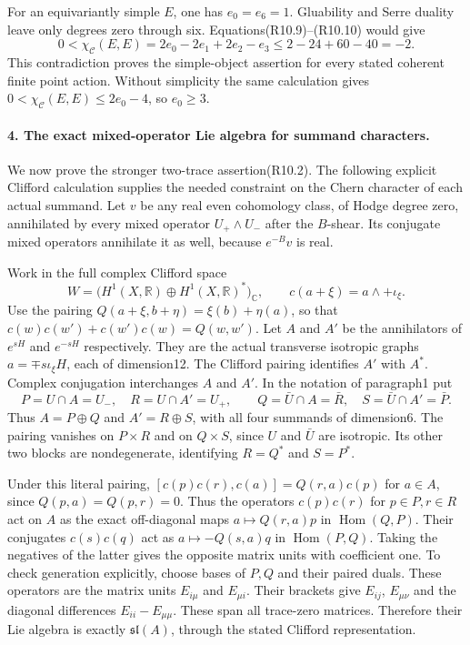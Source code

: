 For an equivariantly simple $E$, one has $e_0=e_6=1$.
Gluability and Serre duality leave only degrees zero through six.
Equations(R10.9)--(R10.10) would give
\[
 0<\chi_{\mathcal C}(E,E)
     =2e_0-2e_1+2e_2-e_3
                 \le2-24+60-40=-2.                         \tag{R10.11}
\]
This contradiction proves the simple-object assertion for every
stated coherent finite point action.
Without simplicity the same calculation gives
$0<\chi_{\mathcal C}(E,E)\le2e_0-4$, so $e_0\ge3$.

\paragraph{4. The exact mixed-operator Lie algebra for summand characters.}
We now prove the stronger two-trace assertion(R10.2).
The following explicit Clifford calculation supplies the needed
constraint on the Chern character of each actual summand.
Let $v$ be any real even cohomology class, of Hodge degree zero,
annihilated by every mixed operator $U_+\wedge U_-$ after the
$B$-shear. Its conjugate mixed operators annihilate it as well,
because $e^{-B}v$ is real.

Work in the full complex Clifford space
\[
 W=\bigl(H^1(X,\mathbb R)\oplus H^1(X,\mathbb R)^*\bigr)_{\mathbb C},
 \qquad c(a+\xi)=a\wedge+\iota_\xi.
\]
Use the pairing $Q(a+\xi,b+\eta)=\xi(b)+\eta(a)$, so that
$c(w)c(w')+c(w')c(w)=Q(w,w')$.
Let $A$ and $A'$ be the annihilators of $e^{sH}$ and
$e^{-sH}$ respectively. They are the actual transverse
isotropic graphs $a=\mp s\iota_\xi H$, each of dimension12.
The Clifford pairing identifies $A'$ with $A^*$.
Complex conjugation interchanges $A$ and $A'$. In the notation
of paragraph1 put
\[
 P=U\cap A=U_-,\quad R=U\cap A'=U_+,
 \qquad Q=\bar U\cap A=\bar R,\quad S=\bar U\cap A'=\bar P.
                                                               \tag{R10.12}
\]
Thus $A=P\oplus Q$ and $A'=R\oplus S$, with all four
summands of dimension6. The pairing vanishes on $P\times R$
and on $Q\times S$, since $U$ and $\bar U$ are isotropic.
Its other two blocks are nondegenerate, identifying
$R=Q^*$ and $S=P^*$.

Under this literal pairing,
$[c(p)c(r),c(a)]=Q(r,a)c(p)$ for $a\in A$, since
$Q(p,a)=Q(p,r)=0$. Thus the operators $c(p)c(r)$ for
$p\in P,r\in R$ act on $A$ as the exact off-diagonal
maps $a\mapsto Q(r,a)p$ in $\operatorname{Hom}(Q,P)$.
Their conjugates $c(s)c(q)$ act as
$a\mapsto-Q(s,a)q$ in $\operatorname{Hom}(P,Q)$.
Taking the negatives of the latter gives the opposite matrix
units with coefficient one. To check generation explicitly,
choose bases of $P,Q$ and their paired duals. These operators
are the matrix units $E_{i\mu}$ and $E_{\mu i}$.
Their brackets give $E_{ij}$, $E_{\mu\nu}$ and the diagonal
differences $E_{ii}-E_{\mu\mu}$. These span all trace-zero
matrices. Therefore their Lie algebra is exactly
$\mathfrak{sl}(A)$, through the stated Clifford representation.


